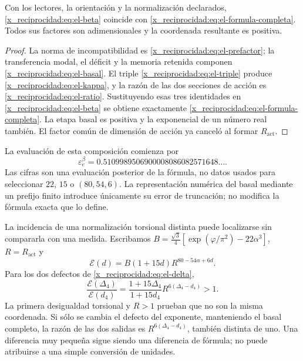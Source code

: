 \begin{theorem}
Con los lectores, la orientación y la normalización declarados,
\eqref{x_reciprocidad:eq:el-beta} coincide con \eqref{x_reciprocidad:eq:el-formula-completa}. Todos
sus factores son adimensionales y la coordenada resultante es positiva.
\end{theorem}
\begin{proof}
La norma de incompatibilidad es \eqref{x_reciprocidad:eq:el-prefactor}; la transferencia modal,
el déficit y la memoria retenida componen \eqref{x_reciprocidad:eq:el-basal}. El
triple \eqref{x_reciprocidad:eq:el-triple} produce \eqref{x_reciprocidad:eq:el-kappa}, y la razón de
las dos secciones de acción es \eqref{x_reciprocidad:eq:el-ratio}. Sustituyendo esas
tres identidades en \eqref{x_reciprocidad:eq:el-beta} se obtiene exactamente
\eqref{x_reciprocidad:eq:el-formula-completa}. La etapa basal es positiva y la
exponencial de un número real también. El factor común de dimensión de
acción ya canceló al formar \(R_{\mathrm{act}}\).
\end{proof}

La evaluación de esta composición comienza por
\begin{equation}
 \varepsilon_e^\beta
 =0.5109989506900008086082571648\ldots.
 \label{x_reciprocidad:eq:el-beta-decimal}
\end{equation}
Las cifras son una evaluación posterior de la fórmula, no datos usados
para seleccionar \(22\), \(15\) o \((80,54,6)\). La representación
numérica del basal mediante un prefijo finito introduce únicamente su
error de truncación; no modifica la fórmula exacta que lo define.

La incidencia de una normalización torsional distinta puede localizarse
sin compararla con una medida. Escribamos
\(B=\frac{\sqrt3}{4}[\exp(\varphi/\pi^2)-22\alpha^3]\),
\(R=R_{\mathrm{act}}\) y
\[
 \mathcal E(d)=B(1+15d)R^{80-54\alpha+6d}.
\]
Para los dos defectos de \eqref{x_reciprocidad:eq:el-delta},
\begin{equation}
 \frac{\mathcal E(\Delta_4)}{\mathcal E(d_4)}
 =\frac{1+15\Delta_4}{1+15d_4}
   R^{6(\Delta_4-d_4)}>1.
 \label{x_reciprocidad:eq:el-normalizacion-beta}
\end{equation}
La primera desigualdad torsional y \(R>1\) prueban que no son la misma
coordenada. Si sólo se cambia el defecto del exponente, manteniendo el
basal completo, la razón de las dos salidas es
\(R^{6(\Delta_4-d_4)}\), también distinta de uno. Una diferencia muy
pequeña sigue siendo una diferencia de fórmula; no puede atribuirse a
una simple conversión de unidades.

